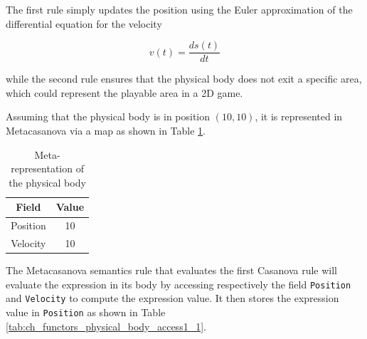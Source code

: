 The first rule simply updates the position using the Euler approximation of the differential equation for the velocity

\begin{equation*}
v(t) = \dfrac{ds(t)}{dt}
\end{equation*}

\noindent
while the second rule ensures that the physical body does not exit a specific area, which could represent the playable area in a 2D game.

Assuming that the physical body is in position $(10,10)$, it is represented in Metacasanova via a map as shown in Table \ref{tab:ch_functors_physical_body}.

\begin{table}
	\centering
	\begin{tabular}{|c|c|}
		\hline
		\textbf{Field} & \textbf{Value} \\
		\hline
		Position	& 10 \\
		\hline
		Velocity & 10 \\
		\hline
	\end{tabular}
	\caption{Meta-representation of the physical body}
	\label{tab:ch_functors_physical_body}
\end{table}

\noindent
The Metacasanova semantics rule that evaluates the first Casanova rule will evaluate the expression in its body by accessing respectively the field \texttt{Position} and \texttt{Velocity} to compute the expression value. It then stores the expression value in \texttt{Position} as shown in Table \ref{tab:ch_functors_physical_body_access1_1}.

